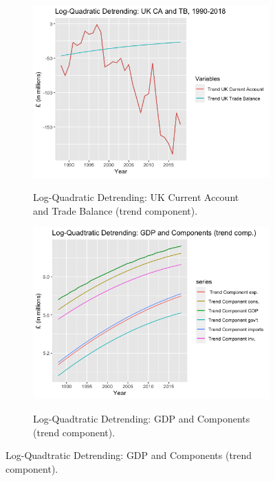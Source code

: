 \documentclass[12pt]{article}
\begin{document}
\begin{figure}[h!]
\centering
\begin{subfigure}{.5\textwidth}
  \centering
\includegraphics[scale=0.45]{13.png}
\label{}
\caption{Log-Quadratic Detrending: UK Current Account \\ and Trade Balance (trend component).}
\end{subfigure}%
\begin{subfigure}{.5\textwidth}
\includegraphics[scale=0.45]{12.png}
\label{}
\caption{Log-Quadtratic Detrending: GDP and Components (trend component).}
\end{subfigure}
\end{figure}
\end{document}
